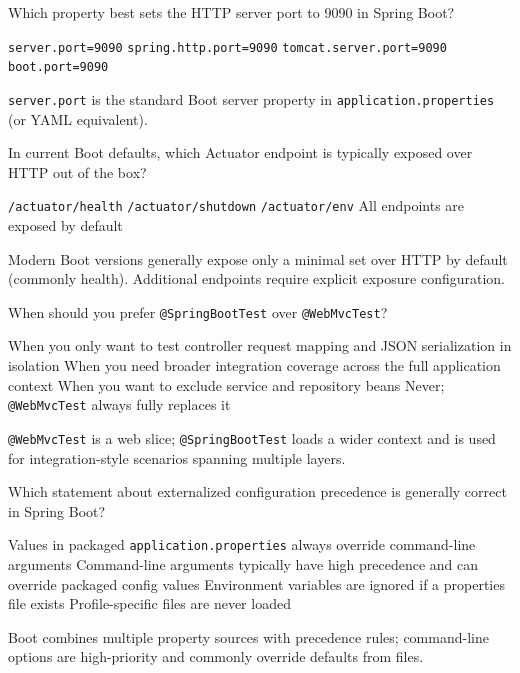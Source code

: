 \question[4]
Which property best sets the HTTP server port to 9090 in Spring Boot?
\begin{choices}
  \CorrectChoice \texttt{server.port=9090}
  \choice \texttt{spring.http.port=9090}
  \choice \texttt{tomcat.server.port=9090}
  \choice \texttt{boot.port=9090}
\end{choices}
\begin{solution}
  \texttt{server.port} is the standard Boot server property in \texttt{application.properties} (or YAML equivalent).
\end{solution}

\question[4]
In current Boot defaults, which Actuator endpoint is typically exposed over HTTP out of the box?
\begin{choices}
  \CorrectChoice \texttt{/actuator/health}
  \choice \texttt{/actuator/shutdown}
  \choice \texttt{/actuator/env}
  \choice All endpoints are exposed by default
\end{choices}
\begin{solution}
  Modern Boot versions generally expose only a minimal set over HTTP by default (commonly health). Additional endpoints require explicit exposure configuration.
\end{solution}

\question[4]
When should you prefer \texttt{@SpringBootTest} over \texttt{@WebMvcTest}?
\begin{choices}
  \choice When you only want to test controller request mapping and JSON serialization in isolation
  \CorrectChoice When you need broader integration coverage across the full application context
  \choice When you want to exclude service and repository beans
  \choice Never; \texttt{@WebMvcTest} always fully replaces it
\end{choices}
\begin{solution}
  \texttt{@WebMvcTest} is a web slice; \texttt{@SpringBootTest} loads a wider context and is used for integration-style scenarios spanning multiple layers.
\end{solution}

\question[4]
Which statement about externalized configuration precedence is generally correct in Spring Boot?
\begin{choices}
  \choice Values in packaged \texttt{application.properties} always override command-line arguments
  \CorrectChoice Command-line arguments typically have high precedence and can override packaged config values
  \choice Environment variables are ignored if a properties file exists
  \choice Profile-specific files are never loaded
\end{choices}
\begin{solution}
  Boot combines multiple property sources with precedence rules; command-line options are high-priority and commonly override defaults from files.
\end{solution}

